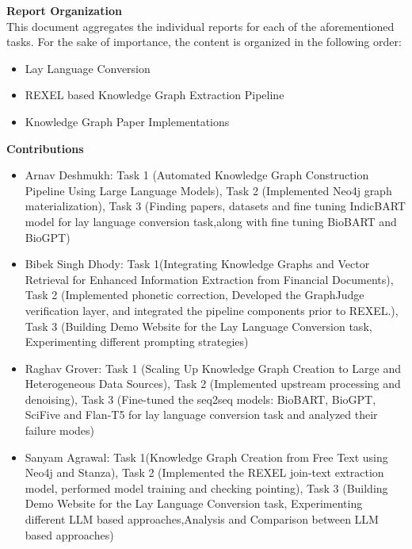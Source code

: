 \documentclass[12pt]{article}
\begin{document}
\vspace{1.5em}
\noindent \textbf{Report Organization} \\
This document aggregates the individual reports for each of the aforementioned tasks. For the sake of importance, the content is organized in the following order:

\begin{itemize}
    \item {Lay Language Conversion}
    \item {REXEL based Knowledge Graph Extraction Pipeline}
    \item {Knowledge Graph Paper Implementations}
\end{itemize}

\vspace{1.5em}
\noindent \textbf{Contributions} \\
\begin{itemize}
    \item Arnav Deshmukh: Task 1 (Automated Knowledge Graph Construction Pipeline Using Large Language Models), Task 2 (Implemented Neo4j graph materialization), Task 3 (Finding papers, datasets and fine tuning IndicBART model for lay language conversion task,along with fine tuning BioBART and BioGPT)
    \item Bibek Singh Dhody: Task 1(Integrating Knowledge Graphs and Vector Retrieval for Enhanced Information Extraction from Financial Documents), Task 2 (Implemented phonetic correction, Developed the GraphJudge verification layer, and integrated the pipeline components prior to REXEL.), Task 3 (Building Demo Website for the Lay Language Conversion task, Experimenting different prompting strategies)
    \item Raghav Grover: Task 1 (Scaling Up Knowledge Graph Creation to Large and Heterogeneous Data Sources), Task 2 (Implemented upstream processing and denoising), Task 3 (Fine-tuned the seq2seq models: BioBART, BioGPT, SciFive and Flan-T5 for lay language conversion task and analyzed their failure modes)
    \item Sanyam Agrawal: Task 1(Knowledge Graph Creation from Free Text using Neo4j and Stanza), Task 2 (Implemented the REXEL join-text extraction model, performed model training and checking pointing), Task 3 (Building Demo Website for the Lay Language Conversion task, Experimenting different LLM based approaches,Analysis and Comparison between LLM based approaches)
\end{itemize}
\end{document}
